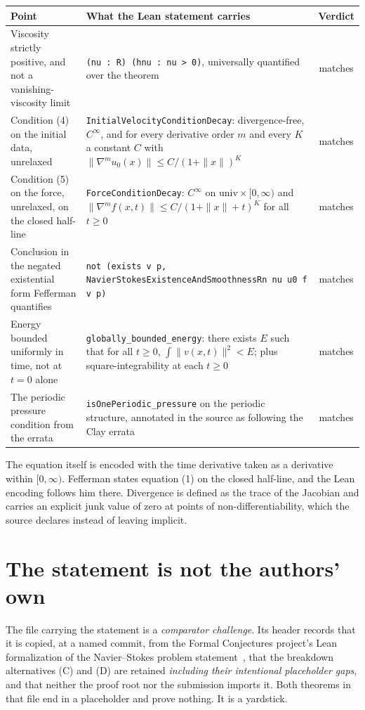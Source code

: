 \begin{center}
\begin{tabular}{@{}p{}p{}c@{}}
\toprule
Point & What the Lean statement carries & Verdict \\
\midrule
Viscosity strictly positive, and not a vanishing-viscosity limit
& \texttt{(nu : R) (hnu : nu > 0)}, universally quantified over the theorem
& matches \\[0.5em]
Condition (4) on the initial data, unrelaxed
& \texttt{InitialVelocityConditionDecay}: divergence-free, $C^\infty$, and for every derivative
order $m$ and every $K$ a constant $C$ with
$\|\nabla^m u_0(x)\| \le C/(1+\|x\|)^K$
& matches \\[0.5em]
Condition (5) on the force, unrelaxed, on the closed half-line
& \texttt{ForceConditionDecay}: $C^\infty$ on $\mathrm{univ}\times[0,\infty)$ and
$\|\nabla^m f(x,t)\| \le C/(1+\|x\|+t)^K$ for all $t\ge0$
& matches \\[0.5em]
Conclusion in the negated existential form Fefferman quantifies
& \texttt{not (exists v p, NavierStokesExistence\-AndSmoothnessRn nu u0 f v p)}
& matches \\[0.5em]
Energy bounded uniformly in time, not at $t=0$ alone
& \texttt{globally\_bounded\_energy}: there exists $E$ such that for all $t\ge0$,
$\int\|v(x,t)\|^2 < E$; plus square-integrability at each $t\ge0$
& matches \\[0.5em]
The periodic pressure condition from the errata
& \texttt{isOnePeriodic\_pressure} on the periodic structure, annotated in the source as following
the Clay errata
& matches \\
\bottomrule
\end{tabular}
\end{center}

The equation itself is encoded with the time derivative taken as a derivative within
$[0,\infty)$. Fefferman states equation (1) on the closed half-line, and the Lean encoding follows
him there. Divergence is defined as the trace of the Jacobian and carries an explicit junk value of
zero at points of non-differentiability, which the source declares instead of leaving implicit.

\section{The statement is not the authors' own}

The file carrying the statement is a \emph{comparator challenge}. Its header records that it is
copied, at a named commit, from the Formal Conjectures project's Lean formalization of the
Navier--Stokes problem statement~\cite{src:Formal-Conjectures}, that the breakdown alternatives (C)
and (D) are retained \emph{including their intentional placeholder gaps}, and that neither the proof
root nor the submission imports it. Both theorems in that file end in a placeholder and prove
nothing. It is a yardstick.

